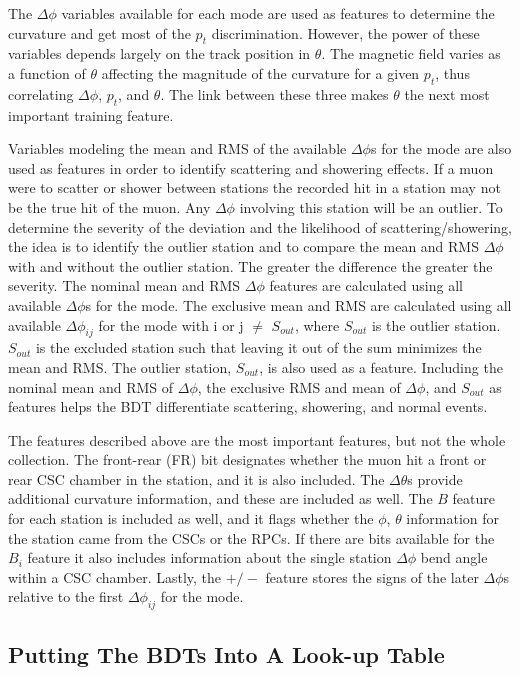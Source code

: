 The $\Delta\phi$ variables available for each mode are used as features to determine the curvature and get most of the $p_t$ discrimination. However, the power of these variables depends largely on the track position in $\theta$. The magnetic field varies as a function of $\theta$ affecting the magnitude of the curvature for a given $p_t$, thus correlating $\Delta\phi$, $p_t$, and $\theta$. The link between these three makes $\theta$ the next most important training feature.

Variables modeling the mean and RMS of the available $\Delta\phi$s for the mode are also used as features in order to identify scattering and showering effects. If a muon were to scatter or shower between stations the recorded hit in a station may not be the true hit of the muon. Any $\Delta\phi$ involving this station will be an outlier. To determine the severity of the deviation and the likelihood of scattering/showering, the idea is to identify the outlier station and to compare the mean and RMS $\Delta\phi$ with and without the outlier station. The greater the difference the greater the severity. The nominal mean and RMS $\Delta\phi$ features are calculated using all available $\Delta\phi$s for the mode. The exclusive mean and RMS are calculated using all available $\Delta\phi_{ij}$ for the mode with i or j $\neq$ $S_{out}$, where $S_{out}$ is the outlier station. $S_{out}$ is the excluded station such that leaving it out of the sum minimizes the mean and RMS. The outlier station, $S_{out}$, is also used as a feature. Including the nominal mean and RMS of $\Delta\phi$, the exclusive RMS and mean of $\Delta\phi$, and $S_{out}$ as features helps the BDT differentiate scattering, showering, and normal events.

The features described above are the most important features, but not the whole collection. The front-rear (FR) bit designates whether the muon hit a front or rear CSC chamber in the station, and it is also included. The $\Delta\theta$s provide additional curvature information, and these are included as well. The $B$ feature for each station is included as well, and it flags whether the $\phi$, $\theta$ information for the station came from the CSCs or the RPCs. If there are bits available for the $B_i$ feature it also includes information about the single station $\Delta\phi$ bend angle within a CSC chamber. Lastly, the $+/-$ feature stores the signs of the later $\Delta\phi$s relative to the first $\Delta\phi_{ij}$ for the mode.

\subsection{Putting The BDTs Into A Look-up Table}

